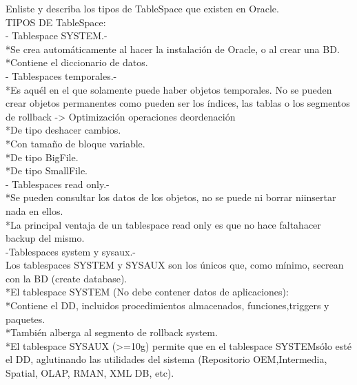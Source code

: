    
   
   
   
   
   
   \item Enliste y describa los tipos de TableSpace que existen en Oracle.\\
   TIPOS DE TableSpace:\\
   
   - Tablespace SYSTEM.-\\
   *Se crea automáticamente al hacer la instalación de Oracle, o al crear una BD.\\
   *Contiene el diccionario de datos.\\
   
   - Tablespaces temporales.-\\
   *Es aquél en el que solamente puede haber objetos temporales. No se pueden crear objetos permanentes como pueden ser los índices, las tablas o los segmentos de rollback -> Optimización operaciones deordenación\\
   *De tipo deshacer cambios.\\
   *Con tamaño de bloque variable.\\
   *De tipo BigFile.\\
   *De tipo SmallFile.\\
   
   - Tablespaces read only.-\\
   *Se pueden consultar los datos de los objetos, no se puede ni borrar niinsertar nada en ellos.\\
   *La principal ventaja de un tablespace read only es que no hace faltahacer backup del mismo.\\
   
   -Tablespaces system y sysaux.-\\
   Los tablespaces SYSTEM y SYSAUX son los únicos que, como mínimo, secrean con la BD (create database).\\
   *El tablespace SYSTEM (No debe contener datos de aplicaciones):\\
   *Contiene el DD, incluidos procedimientos almacenados, funciones,triggers y paquetes.\\
   *También alberga al segmento de rollback system.\\
   *El tablespace SYSAUX (>=10g) permite que en el tablespace SYSTEMsólo esté el DD, aglutinando las utilidades del sistema (Repositorio OEM,Intermedia, Spatial, OLAP, RMAN, XML DB, etc).\\
   
   
